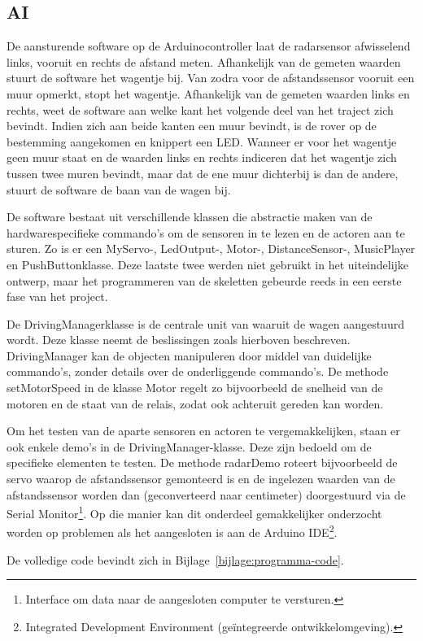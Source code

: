  
\subsection{AI}
De aansturende software op de Arduinocontroller laat de radarsensor afwisselend links, vooruit en rechts de afstand meten. Afhankelijk van de gemeten waarden stuurt de software het wagentje bij.
Van zodra voor de afstandssensor vooruit een muur opmerkt, stopt het wagentje. Afhankelijk van de gemeten waarden links en rechts, weet de software aan welke kant het volgende deel van het traject zich bevindt.
Indien zich aan beide kanten een muur bevindt, is de rover op de bestemming aangekomen en knippert een LED.
Wanneer er voor het wagentje geen muur staat en de waarden links en rechts indiceren dat het wagentje zich tussen twee muren bevindt, maar dat de ene muur dichterbij is dan de andere, stuurt de software de baan van de wagen bij.

De software bestaat uit verschillende klassen die abstractie maken van de hardwarespecifieke commando's om de sensoren in te lezen en de actoren aan te sturen.
Zo is er een MyServo-, LedOutput-, Motor-, DistanceSensor-, MusicPlayer en PushButtonklasse. Deze laatste twee werden niet gebruikt in het uiteindelijke ontwerp, maar het programmeren van de skeletten gebeurde reeds in een eerste fase van het project.

De DrivingManagerklasse is de centrale unit van waaruit de wagen aangestuurd wordt. Deze klasse neemt de beslissingen zoals hierboven beschreven. 
DrivingManager kan de objecten manipuleren door middel van duidelijke commando's, zonder details over de onderliggende commando's. 
De methode setMotorSpeed in de klasse Motor regelt zo bijvoorbeeld de snelheid van de motoren en de staat van de relais, zodat ook achteruit gereden kan worden.

Om het testen van de aparte sensoren en actoren te vergemakkelijken, staan er ook enkele demo's in de DrivingManager-klasse. Deze zijn bedoeld om de specifieke elementen te testen. 
De methode radarDemo roteert bijvoorbeeld de servo waarop de afstandssensor gemonteerd is en de ingelezen waarden van de afstandssensor worden dan (geconverteerd naar centimeter) doorgestuurd via de Serial Monitor\footnote{Interface om data naar de aangesloten computer te versturen.}. 
Op die manier kan dit onderdeel gemakkelijker onderzocht worden op problemen als het aangesloten is aan de Arduino IDE\footnote{Integrated Development Environment (geïntegreerde ontwikkelomgeving).}.

De volledige code bevindt zich in Bijlage~\ref{bijlage:programma-code}.